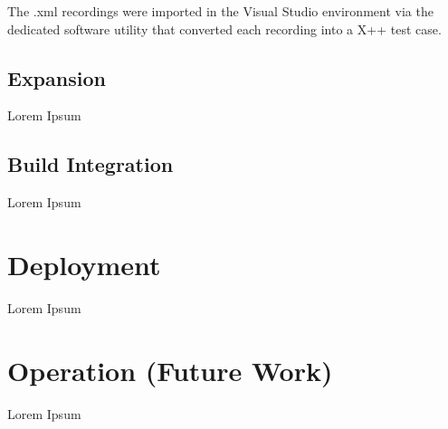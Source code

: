 The .xml recordings were imported in the Visual Studio environment via the dedicated software utility that converted each recording into a X++ test case.  

\subsection{Expansion}

Lorem Ipsum

\subsection{Build Integration}

Lorem Ipsum

\section{Deployment}

Lorem Ipsum

\section{Operation (Future Work)} 

Lorem Ipsum